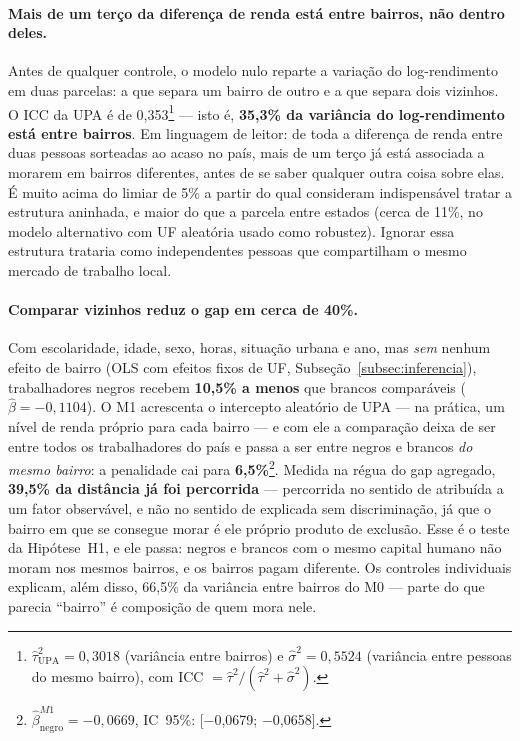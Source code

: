 \documentclass[12pt, a4paper, oneside]{article}
\begin{document}
\paragraph{Mais de um terço da diferença de renda está entre bairros, não dentro deles.}
Antes de qualquer controle, o modelo nulo reparte a variação do log-rendimento em duas
parcelas: a que separa um bairro de outro e a que separa dois vizinhos. O ICC da UPA é
de 0,353\footnote{$\hat\tau^2_{\text{UPA}} = 0,3018$ (variância entre
bairros) e $\hat\sigma^2 = 0,5524$ (variância entre pessoas do mesmo bairro), com
ICC $= \hat\tau^2/(\hat\tau^2+\hat\sigma^2)$.} --- isto é, \textbf{35,3\% da
variância do log-rendimento está entre bairros}. Em linguagem de leitor: de toda a
diferença de renda entre duas pessoas sorteadas ao acaso no país, mais de um terço já
está associada a morarem em bairros diferentes, antes de se saber qualquer outra coisa
sobre elas. É muito acima do limiar de 5\% a partir do qual 
consideram indispensável tratar a estrutura aninhada, e maior do que a parcela entre
estados (cerca de 11\%, no modelo alternativo com UF aleatória usado como robustez).
Ignorar essa estrutura trataria como independentes pessoas que compartilham o mesmo
mercado de trabalho local.

\paragraph{Comparar vizinhos reduz o gap em cerca de 40\%.}
Com escolaridade, idade, sexo, horas, situação urbana e ano, mas \emph{sem} nenhum
efeito de bairro (OLS com efeitos fixos de UF, Subseção~\ref{subsec:inferencia}),
trabalhadores negros recebem \textbf{10,5\% a menos} que brancos comparáveis
($\hat\beta = −0,1104$). O M1 acrescenta o intercepto aleatório de UPA --- na
prática, um nível de renda próprio para cada bairro --- e com ele a comparação deixa de
ser entre todos os trabalhadores do país e passa a ser entre negros e brancos \emph{do
mesmo bairro}: a penalidade cai para \textbf{6,5\%}\footnote{$\hat\beta_{\text{negro}}^{M1} = −0,0669$, IC~95\%: [−0,0679; −0,0658].}. Medida na régua do gap agregado,
\textbf{39,5\% da distância já foi percorrida} --- percorrida no sentido de
atribuída a um fator observável, e não no sentido de explicada sem discriminação, já que
o bairro em que se consegue morar é ele próprio produto de exclusão. Esse é o teste da
Hipótese~H1, e ele passa: negros e brancos com o mesmo capital humano não moram nos
mesmos bairros, e os bairros pagam diferente. Os controles individuais explicam, além
disso, 66,5\% da variância entre bairros do M0 --- parte do que parecia
``bairro'' é composição de quem mora nele.
\end{document}
